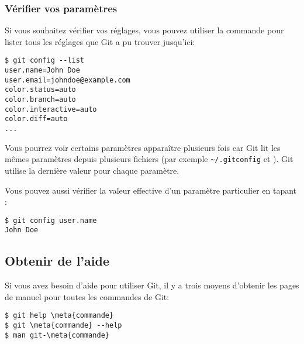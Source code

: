
\subsubsection{Vérifier vos paramètres}

Si vous souhaitez vérifier vos réglages, vous pouvez utiliser la commande  pour lister tous les réglages que Git a pu trouver jusqu'ici:
\begin{Schunk}
\begin{Verbatim}
$ git config --list
user.name=John Doe
user.email=johndoe@example.com
color.status=auto
color.branch=auto
color.interactive=auto
color.diff=auto
...
\end{Verbatim}
\end{Schunk}

Vous pourrez voir certains paramètres apparaître plusieurs fois car Git lit les mêmes paramètres depuis plusieurs fichiers (par exemple \verb=~/.gitconfig= et ).
Git utilise la dernière valeur pour chaque paramètre.

Vous pouvez aussi vérifier la valeur effective d'un paramètre particulier en tapant :
\begin{Schunk}
\begin{Verbatim}
$ git config user.name
John Doe
\end{Verbatim}
\end{Schunk}

\subsection{Obtenir de l'aide}
\label{sec:git:help}

Si vous avez besoin d'aide pour utiliser Git, il y a trois moyens d'obtenir les pages de manuel pour toutes les commandes de Git:

\begin{Schunk}
\begin{Verbatim}[commandchars=\\\{\}]
$ git help \meta{commande}
$ git \meta{commande} --help
$ man git-\meta{commande}
\end{Verbatim}
\end{Schunk}


